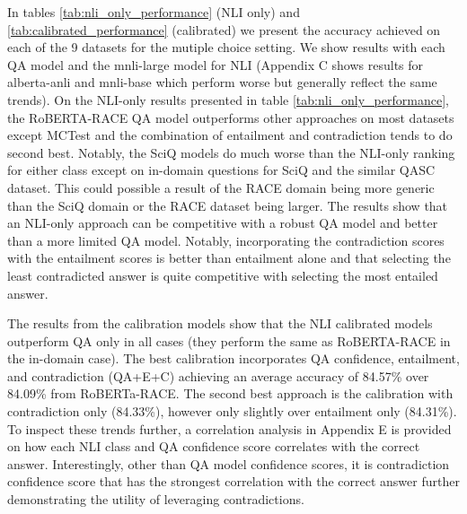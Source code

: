 \documentclass[11pt]{article}
\begin{document}
In tables \ref{tab:nli_only_performance} (NLI only) and \ref{tab:calibrated_performance} (calibrated) we present the accuracy achieved on each of the 9 datasets for the mutiple choice setting. We show results with each QA model and the mnli-large model for NLI (Appendix C shows results for alberta-anli and mnli-base which perform worse but generally reflect the same trends). On the NLI-only results presented in table \ref{tab:nli_only_performance}, the RoBERTA-RACE QA model outperforms other approaches on most datasets except MCTest and the combination of entailment and contradiction tends to do second best. Notably, the SciQ models do much worse than the NLI-only ranking for either class except on in-domain questions for SciQ and the similar QASC dataset. This could possible a result of the RACE domain being more generic than the SciQ domain or the RACE dataset being larger. The results show that an NLI-only approach can be competitive with a robust QA model and better than a more limited QA model. Notably, incorporating the contradiction scores with the entailment scores is better than entailment alone and that selecting the least contradicted answer is quite competitive with selecting the most entailed answer.

The results from the calibration models show that the NLI calibrated models outperform QA only in all cases (they perform the same as RoBERTA-RACE in the in-domain case). The best calibration incorporates QA confidence, entailment, and contradiction (QA+E+C) achieving an average accuracy of 84.57\% over 84.09\% from RoBERTa-RACE. The second best approach is the calibration with contradiction only (84.33\%), however only slightly over entailment only (84.31\%). To inspect these trends further, a correlation analysis in Appendix E is provided on how each NLI class and QA confidence score correlates with the correct answer. Interestingly, other than QA model confidence scores, it is contradiction confidence score that has the strongest correlation with the correct answer further demonstrating the utility of leveraging contradictions.
\end{document}
